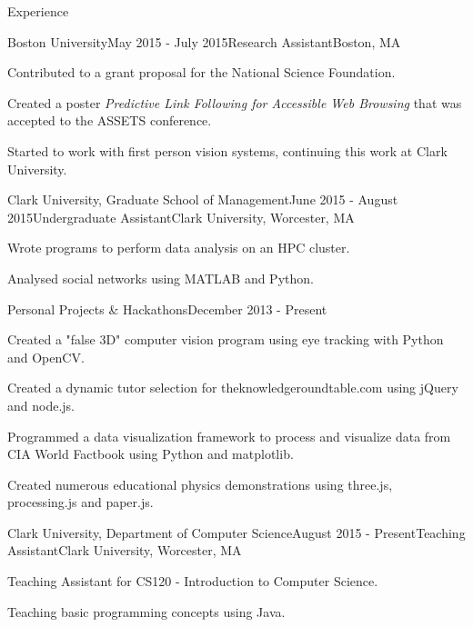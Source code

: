 \documentclass{resume} %
\begin{document}
\begin{rSection}{Experience}

\begin{rSubsection}{Boston University}{May 2015 - July 2015}{Research Assistant}{Boston, MA}
\item Contributed to a grant proposal for the National Science Foundation.
\item Created a poster \emph{Predictive Link Following for Accessible Web Browsing} that was accepted to the ASSETS conference.
\item Started to work with first person vision systems, continuing this work at Clark University.
\end{rSubsection}


\begin{rSubsection}{Clark University, Graduate School of Management}{June 2015 - August 2015}{Undergraduate Assistant}{Clark University, Worcester, MA}
\item Wrote programs to perform data analysis on an HPC cluster.
\item Analysed social networks using MATLAB and Python.
\end{rSubsection}


\begin{rSubsection}{Personal Projects \& Hackathons}{December 2013 - Present}{}{}
\item Created a "false 3D" computer vision program using eye tracking with Python and OpenCV.
\item Created a dynamic tutor selection for theknowledgeroundtable.com using jQuery and node.js.
\item Programmed a data visualization framework to process and visualize data from CIA World Factbook using Python and matplotlib.
\item Created numerous educational physics demonstrations using three.js, processing.js and paper.js.
\end{rSubsection}


\begin{rSubsection}{Clark University, Department of Computer Science}{August 2015 - Present}{Teaching Assistant}{Clark University, Worcester, MA}
\item Teaching Assistant for CS120 - Introduction to Computer Science.
\item Teaching basic programming concepts using Java.
\end{rSubsection}

\end{rSection}
\end{document}
